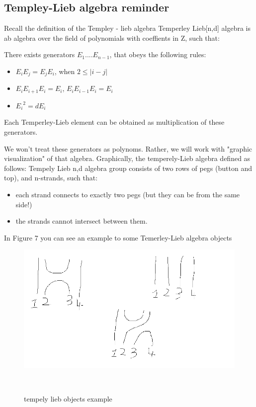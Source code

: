 \documentclass{article}
\begin{document}
\subsection{Templey-Lieb algebra reminder}
Recall the definition of the Templey - lieb algebra 
Temperley Lieb[n,d] algebra is ab algebra over the field of polynomials with coeffients in Z, such that:

There exists generators $E_{1}....E_{n-1}$, that obeys the following rules:
\begin{itemize}
\item \(E_{i}E_{j} = E_{j}E_{i}\), when \(2 \leq |i-j|\)
\item \(E_{i}E_{i+1}E_{i} = E_{i}\), \(E_{i}E_{i-1}E_{i} = E_{i}\)
\item \({E_{i}}^2 = dE_{i}\)
\end{itemize}

Each Temperley-Lieb element can be obtained as multiplication of these generators.

We won't treat these generators as polynoms. Rather, we will work with "graphic visualization" of that algebra. Graphically, the temperely-Lieb algebra defined as follows:
Tempely Lieb {n,d} algebra group consists of two rows of pegs (button and top), and n-strands, such that:
\begin{itemize}
\item each strand connects to exactly two pegs (but they can be from the same side!)
\item the strands cannot intersect between them.
\end{itemize}

In Figure 7 you can see an example to some Temerley-Lieb algebra objects
\begin{figure}
\includegraphics[scale=0.25]{tempely_lieb_generators} 
\caption{tempely lieb objects example}\
\end{figure}
\end{document}
